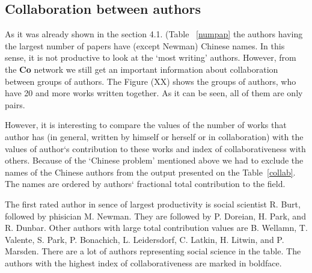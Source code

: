 \documentclass[11pt]{article} %
\begin{document}
\subsection{Collaboration between authors}  

As it was already shown in the section 4.1. (Table~ \ref{numpap} the authors having the largest number of papers have (except Newman) Chinese names. In this sense, it is not productive to look at the `most writing' authors. However, from the \textbf{Co} network we still get an important information about collaboration between groups of authors. The Figure (XX) shows the groups of authors, who have 20 and more works written together. As it can be seen, all of them are only pairs. \medskip  


However, it is interesting to compare the values of the number of works that author has (in general, written by himself or herself or in collaboration) with the values of author`s contribution to these works and index of collaborativeness with others. Because of the `Chinese problem'  mentioned above we had to exclude the names of the Chinese authors from the output presented on the Table~\ref{collab}.  The names are ordered by authors` fractional total contribution to the field.\medskip  
 
The first rated author in sence of largest productivity is social scientist R. Burt, followed by phisician M. Newman. They are followed by P. Doreian, H. Park, and R. Dunbar. Other authors with large total contribution values are B. Wellamn, T. Valente, S. Park, P. Bonachich, L. Leidersdorf, C. Latkin, H. Litwin, and P. Marsden. There are a lot of authors representing social science in the table. The authors with the highest index of collaborativeness are marked in boldface. \medskip 
\end{document}
